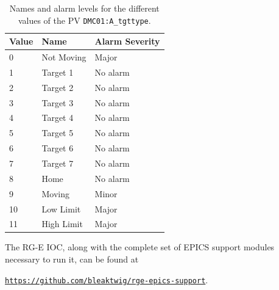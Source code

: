     \begin{table}[b!]
        \caption{Names and alarm levels for the different values of the PV \texttt{DMC01:A\_tgttype}.}

        \begin{center}
            \begin{tabularx}{220pt}{lll}
                \hline
                \textbf{Value} & \textbf{Name} & \textbf{Alarm Severity} \\
                \hline
                 0             & Not Moving    & Major                   \\
                 1             & Target 1      & No alarm                \\
                 2             & Target 2      & No alarm                \\
                 3             & Target 3      & No alarm                \\
                 4             & Target 4      & No alarm                \\
                 5             & Target 5      & No alarm                \\
                 6             & Target 6      & No alarm                \\
                 7             & Target 7      & No alarm                \\
                 8             & Home          & No alarm                \\
                 9             & Moving        & Minor                   \\
                10             & Low Limit     & Major                   \\
                11             & High Limit    & Major                   \\
                \hline
            \end{tabularx}
        \end{center}
        \label{tab::tgttypespv}
    \end{table}

    The RG-E IOC, along with the complete set of EPICS support modules necessary to run it, can be found at

    \begin{center}
        \hyperlink{https://github.com/bleaktwig/rge-epics-support}{\texttt{https://github.com/bleaktwig/rge-epics-support}}.
    \end{center}

